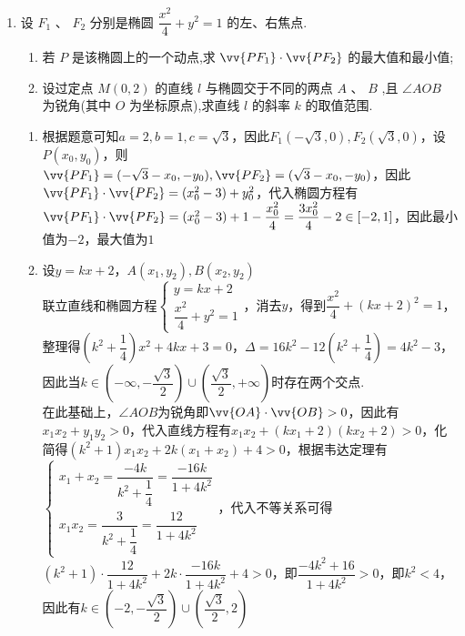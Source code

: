\begin{enumerate}
    \item 设 ${F}_{1}\text{ 、 }{F}_{2}$ 分别是椭圆 $\dfrac{{x}^{2}}{4} + {y}^{2} = 1$ 的左、右焦点.
    \begin{enumerate}
        \item 若 $P$ 是该椭圆上的一个动点,求 $\vv{P{F}_{1}} \cdot  \vv{P{F}_{2}}$ 的最大值和最小值;
        \item 设过定点 $M\left( {0,2}\right)$ 的直线 $l$ 与椭圆交于不同的两点 $A$ 、 $B$ ,且 $\angle {AOB}$ 为锐角(其中 $O$ 为坐标原点),求直线 $l$ 的斜率 $k$ 的取值范围.
    \end{enumerate}
    \begin{jieda}
        \begin{enumerate}
            \item 根据题意可知$a = 2, b = 1, c = \sqrt{3}$，因此$F_1(-\sqrt{3}, 0), F_2(\sqrt{3}, 0)$，设$P(x_0, y_0)$，则$\vv{P{F}_{1}} = (-\sqrt{3}-x_0, -y_0), \vv{PF_2} = (\sqrt{3}-x_0, -y_0)$，因此$\vv{P{F}_{1}} \cdot \vv{P{F}_{2}} = (x_0^2-3)+y_0^2$，代入椭圆方程有$\vv{P{F}_{1}} \cdot \vv{P{F}_{2}} = (x_0^2-3)+1-\dfrac{x_0^2}{4} = \dfrac{3x_0^2}{4}-2 \in [-2, 1]$，因此最小值为$-2$，最大值为$1$
            \item 设$y = kx+2$，$A(x_1, y_2), B(x_2, y_2)$ \\
            联立直线和椭圆方程$\left\{\begin{array}{l}
                y = kx+2 \\
                \dfrac{{x}^{2}}{4} + {y}^{2} = 1
            \end{array}\right.$，消去$y$，得到$\dfrac{x^2}{4} + (kx+2)^2 = 1$，整理得$\left(k^2+\dfrac{1}{4}\right)x^2+4kx+3=0$，$\Delta = 16k^2-12\left(k^2+\dfrac{1}{4}\right) = 4k^2-3$，因此当$k \in \left(-\infty, -\dfrac{\sqrt{3}}{2}\right) \cup \left(\dfrac{\sqrt{3}}{2}, +\infty\right)$时存在两个交点. \\
            在此基础上，$\angle AOB$为锐角即$\vv{OA} \cdot \vv{OB} > 0$，因此有$x_1x_2+y_1y_2 > 0$，代入直线方程有$x_1x_2+(kx_1+2)(kx_2+2) > 0$，化简得$(k^2+1)x_1x_2+2k(x_1+x_2)+4>0$，根据韦达定理有$\left\{\begin{array}{l}
                x_1+x_2 = \dfrac{-4k}{k^2+\dfrac{1}{4}} = \dfrac{-16k}{1+4k^2}  \\
                x_1x_2 = \dfrac{3}{k^2+\dfrac{1}{4}} = \dfrac{12}{1+4k^2}
            \end{array}\right.$，代入不等关系可得$(k^2+1)\cdot \dfrac{12}{1+4k^2} + 2k \cdot \dfrac{-16k}{1+4k^2} + 4>0$，即$\dfrac{-4k^2+16}{1+4k^2} > 0$，即$k^2 < 4$，因此有$k \in \left(-2, -\dfrac{\sqrt{3}}{2}\right) \cup \left(\dfrac{\sqrt{3}}{2}, 2\right)$

\end{enumerate}
\end{jieda}
\end{enumerate}

